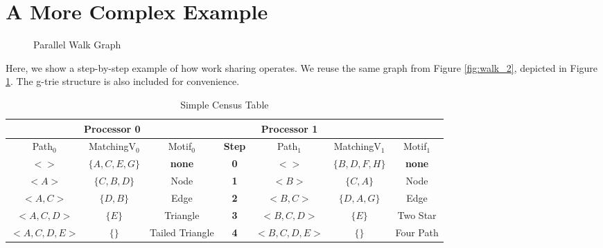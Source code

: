 \documentclass[12pt,twoside]{reedthesis}
\begin{document}
\section{A More Complex Example} \label{sec:comp_ex}
% 

\begin{figure}[h]
	\caption{Parallel Walk Graph}
	\centering
	\label{fig:par_walk_graph}
\end{figure}

Here, we show a step-by-step example of how work sharing operates. We reuse the same graph from Figure \ref{fig:walk_2}, depicted in Figure \ref{fig:par_walk_graph}. The g-trie structure is also included for convenience.


\begin{table}[h!]
\begin{tabular}{ |c c c| c | c c c |  }
	 \hline
 	\multicolumn{3}{|c|}{Processor 0} &  & Processor 1\\
 	\hline
	 Path$_{0}$ & MatchingV$_{0}$ & Motif$_{0}$ &\textbf{Step} & Path$_{1}$ & MatchingV$_{1}$ & Motif$_{1}$ \\
 	\hline
	$<  >$ & $\{A,C,E, G\}$ & \textbf{none} &\textbf{0}& $<  >$ & $\{B, D, F, H\}$ & \textbf{none} \\
	$<A>$ & $\{C,B,D\}$ & Node &\textbf{1}& $<B>$ & $\{C,A \}$ & Node \\
	$<A,C>$ & $\{D,B\}$ & Edge &\textbf{2}& $<B,C>$ & $\{D,A,G\}$ & Edge \\
	$<A,C,D>$ & $\{E\}$ & Triangle &\textbf{3}& $<B,C,D>$ & $\{E\}$ & Two Star \\
	$<A,C,D,E>$ & $\{\}$ & Tailed Triangle &\textbf{4}& $<B,C,D,E>$ & $\{\}$ & Four Path \\
	 \hline
\end{tabular}
 \caption{Simple Census Table}
\label{table:par_1}
\end{table}
\end{document}
